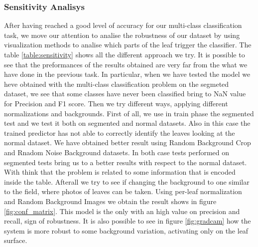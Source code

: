 \subsubsection{Sensitivity Analisys}
After having reached a good level of accuracy for our multi-class classification task, we move our attention to analise the robustness of our dataset by using visualization methods to analise which parts of the leaf trigger the classifier. The table \ref{table:sensitivity} shows all the different approach we try. It is possible to see that the preformances of the results obtained are very far from the what we have done in the previous task. In particular, when we have tested the model we heve obtained with the multi-class classification problem on the segmeted dataset, we see that some classes have never been classified bring to NaN value for Precision and F1 score. Then we try different ways, applying different normalizations and backgrounds. First of all, we use in train phase the segmented test and we test it both on segmented and normal datasets. Also in this case the trained predictor has not able to correctly identify the leaves looking at the normal dataset. We have obtained better result using Random Background Crop and Rnadom Noise Background datasets. In both case tests performed on segmented tests bring us to a better results with respect to the normal dataset. With think that the problem is related to some information that is encoded inside the table. Afterall we try to see if changing the background to one similar to the field, where photos of leaves can be taken. Using per-leaf normalization and Random Background Images we obtain the result shows in figure \ref{fig:conf_matrix}. This model is the only with an high value on precision and recall, sign of robustness. It is also possible to see in figure \ref{fig:gradcam} how the system is more robust to some background variation, activating only on the leaf surface.
